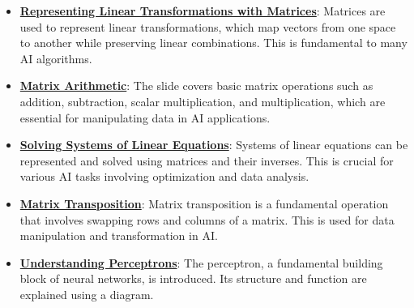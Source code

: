 \documentclass{article}%
\begin{document}
\begin{itemize}[leftmargin=*]%
\item \href{https://purdue.brightspace.com/d2l/common/assets/pdfjs-d2l-dist/1.0.14-legacy/web/viewer.html?file=%2Fcontent%2Fenforced%2F1095467-wl.202510.CS.24300.001%2F04L1-Linear Algebra Primer.pdf%3Fou%3D1095467&lang=en-us&container=d2l-fileviewer-rendered-pdf&fullscreen=d2l-fileviewer-rendered-pdf-dialog&height=667#page=5}{\textbf{Representing Linear Transformations with Matrices}}: Matrices are used to represent linear transformations, which map vectors from one space to another while preserving linear combinations. This is fundamental to many AI algorithms.%
\item \href{https://purdue.brightspace.com/d2l/common/assets/pdfjs-d2l-dist/1.0.14-legacy/web/viewer.html?file=%2Fcontent%2Fenforced%2F1095467-wl.202510.CS.24300.001%2F04L1-Linear Algebra Primer.pdf%3Fou%3D1095467&lang=en-us&container=d2l-fileviewer-rendered-pdf&fullscreen=d2l-fileviewer-rendered-pdf-dialog&height=667#page=9}{\textbf{Matrix Arithmetic}}: The slide covers basic matrix operations such as addition, subtraction, scalar multiplication, and multiplication, which are essential for manipulating data in AI applications.%
\item \href{https://purdue.brightspace.com/d2l/common/assets/pdfjs-d2l-dist/1.0.14-legacy/web/viewer.html?file=%2Fcontent%2Fenforced%2F1095467-wl.202510.CS.24300.001%2F04L1-Linear Algebra Primer.pdf%3Fou%3D1095467&lang=en-us&container=d2l-fileviewer-rendered-pdf&fullscreen=d2l-fileviewer-rendered-pdf-dialog&height=667#page=11}{\textbf{Solving Systems of Linear Equations}}: Systems of linear equations can be represented and solved using matrices and their inverses. This is crucial for various AI tasks involving optimization and data analysis.%
\item \href{https://purdue.brightspace.com/d2l/common/assets/pdfjs-d2l-dist/1.0.14-legacy/web/viewer.html?file=%2Fcontent%2Fenforced%2F1095467-wl.202510.CS.24300.001%2F04L1-Linear Algebra Primer.pdf%3Fou%3D1095467&lang=en-us&container=d2l-fileviewer-rendered-pdf&fullscreen=d2l-fileviewer-rendered-pdf-dialog&height=667#page=16}{\textbf{Matrix Transposition}}: Matrix transposition is a fundamental operation that involves swapping rows and columns of a matrix. This is used for data manipulation and transformation in AI.%
\item \href{https://purdue.brightspace.com/d2l/common/assets/pdfjs-d2l-dist/1.0.14-legacy/web/viewer.html?file=%2Fcontent%2Fenforced%2F1095467-wl.202510.CS.24300.001%2F04L1-Linear Algebra Primer.pdf%3Fou%3D1095467&lang=en-us&container=d2l-fileviewer-rendered-pdf&fullscreen=d2l-fileviewer-rendered-pdf-dialog&height=667#page=17}{\textbf{Understanding Perceptrons}}: The perceptron, a fundamental building block of neural networks, is introduced. Its structure and function are explained using a diagram.%

\end{itemize}
\end{document}
